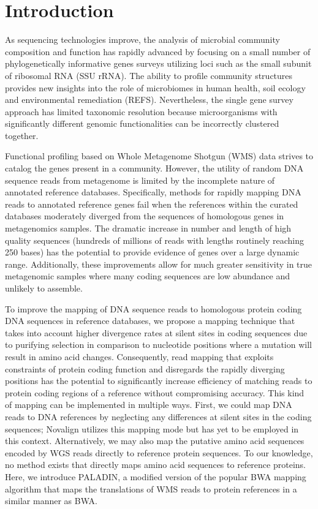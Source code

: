\section{Introduction} 
As sequencing technologies improve, the analysis of microbial community composition and function has rapidly advanced by focusing on a small number of phylogenetically informative genes surveys utilizing loci such as the small subunit of ribosomal RNA (SSU rRNA). The ability to profile community structures provides new insights into the role of microbiomes in human health, soil ecology and environmental remediation (REFS). Nevertheless, the single gene survey approach has limited taxonomic resolution because microorganisms with significantly different genomic functionalities can be incorrectly clustered together. 

Functional profiling based on Whole Metagenome Shotgun (WMS) data strives to catalog the genes present in a community. However, the utility of random DNA sequence reads from metagenome is limited by the incomplete nature of annotated reference databases. Specifically, methods for rapidly mapping DNA reads to annotated reference genes fail when the references within the curated databases moderately diverged from the sequences of homologous genes in metagenomics samples.  The dramatic increase in number and length of high quality sequences (hundreds of millions of reads with lengths routinely reaching 250 bases) has the potential to provide evidence of genes over a large dynamic range. Additionally, these improvements allow for much greater sensitivity in true metagenomic samples where many coding sequences are low abundance and unlikely to assemble.  

To improve the mapping of DNA sequence reads to homologous protein coding DNA sequences in reference databases, we propose a mapping technique that takes into account higher divergence rates at silent sites in coding sequences due to purifying selection in comparison to nucleotide positions where a mutation will result in amino acid changes. Consequently, read mapping that exploits constraints of protein coding function and disregards the rapidly diverging positions has the potential to significantly increase efficiency of matching reads to protein coding regions of a reference without compromising accuracy. This kind of mapping can be implemented in multiple ways. First, we could map DNA reads to DNA references by neglecting any differences at silent sites in the coding sequences; Novalign utilizes this mapping mode but has yet to be employed in this context. Alternatively, we may also map the putative amino acid sequences encoded by WGS reads directly to reference protein sequences. To our knowledge, no method exists that directly maps amino acid sequences to reference proteins. Here, we introduce PALADIN, a modified version of the popular BWA mapping algorithm that maps the translations of WMS reads to protein references in a similar manner as BWA. 

